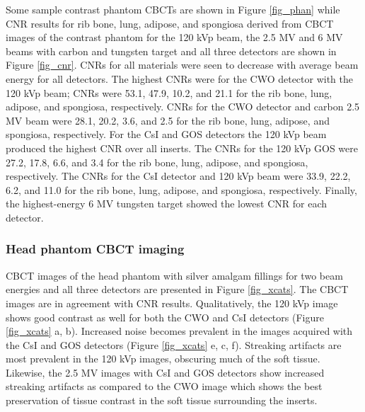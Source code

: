 Some sample contrast phantom CBCTs are shown in Figure \ref{fig_phan} while CNR results for rib bone, lung, adipose, and spongiosa derived from CBCT images of the contrast phantom for the 120 kVp beam, the 2.5 MV and 6 MV beams with carbon and tungsten target and all three detectors are shown in Figure \ref{fig_cnr}.
CNRs for all materials were seen to decrease with average beam energy for all detectors. The highest CNRs were for the CWO detector with the 120 kVp beam; CNRs were 53.1, 47.9, 10.2, and 21.1 for the rib bone, lung, adipose, and spongiosa, respectively. CNRs for the CWO detector and carbon 2.5 MV beam were 28.1, 20.2, 3.6, and 2.5 for the rib bone, lung, adipose, and spongiosa, respectively. For the CsI and GOS detectors the 120 kVp beam produced the highest CNR over all inserts. The CNRs for the 120 kVp GOS were 27.2, 17.8, 6.6, and 3.4 for the rib bone, lung, adipose, and spongiosa, respectively. The CNRs for the  CsI detector and 120 kVp beam were 33.9, 22.2, 6.2, and 11.0 for the rib bone, lung, adipose, and spongiosa, respectively. Finally, the highest-energy 6 MV tungsten target showed the lowest CNR for each detector.

\subsubsection{Head phantom CBCT imaging}


CBCT images of the head phantom with silver amalgam fillings for two beam energies and all three detectors are presented in Figure \ref{fig_xcats}. The CBCT images are in agreement with CNR results. Qualitatively, the 120 kVp image shows good contrast as well for both the CWO and CsI detectors (Figure \ref{fig_xcats} a, b). Increased noise becomes prevalent in the images acquired with the CsI and GOS detectors (Figure \ref{fig_xcats} e, c, f). Streaking artifacts are most prevalent in the 120 kVp images, obscuring much of the soft tissue. Likewise, the 2.5 MV images with CsI and GOS detectors show increased streaking artifacts as compared to the CWO image which shows the best preservation of tissue contrast in the soft tissue surrounding the inserts.

